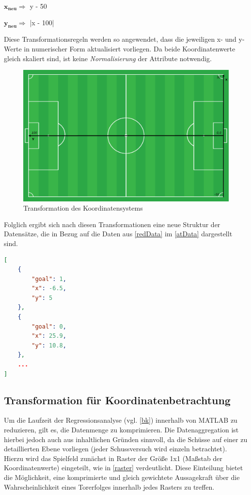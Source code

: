\centerline{$\boldsymbol{x_{neu}} \Rightarrow$ y - 50 }
\centerline{$\boldsymbol{y_{neu}} \Rightarrow$ |x - 100|}

Diese Transformationsregeln werden so angewendet, dass die jeweiligen x- und y-Werte in numerischer Form aktualisiert vorliegen. Da beide Koordinatenwerte gleich skaliert sind, ist keine \textit{Normalisierung} der Attribute notwendig.

\begin{figure}[H]
\centering
\includegraphics[scale=0.27]{se-wa-jpg/transf_pitch}
\caption[Transformation des Koordinatensystems]{Transformation des Koordinatensystems}
\label{transf_pitch}
\end{figure}

\enlargethispage{2\baselineskip} Folglich ergibt sich nach diesen Transformationen eine neue Struktur der Datensätze, die in Bezug auf die Daten aus \vref{redData} im \vref{atData} dargestellt sind.\newline

\begin{lstlisting}[caption=\captionListingText,language=json,xleftmargin=5mm,label=atData] 
[
	{
		"goal": 1,
		"x": -6.5,
		"y": 5
	},
	{
		"goal": 0,
		"x": 25.9,
		"y": 10.8,
	},
	...
]
\end{lstlisting}

\subsection{Transformation für Koordinatenbetrachtung}
\label{kt}
Um die Laufzeit der Regressionsanalyse (vgl. \vref{bk}) innerhalb von MATLAB zu reduzieren, gilt es, die Datenmenge zu komprimieren. Die Datenaggregation ist hierbei jedoch auch aus inhaltlichen Gründen sinnvoll, da die Schüsse auf einer zu detaillierten Ebene vorliegen (jeder Schussversuch wird einzeln betrachtet). Hierzu wird das Spielfeld zunächst in Raster der Größe \textsf{1x1} (Maßstab der Koordinatenwerte) eingeteilt, wie in \vref{raster} verdeutlicht. Diese Einteilung bietet die Möglichkeit, eine komprimierte und gleich gewichtete Aussagekraft über die Wahrscheinlichkeit eines Torerfolges innerhalb jedes Rasters zu treffen.

